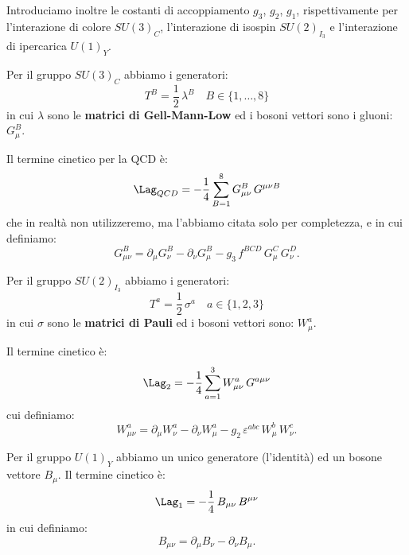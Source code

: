 Introduciamo inoltre le costanti di accoppiamento $g_3$, $g_2$, $g_1$, rispettivamente per l'interazione di colore $SU(3)_C$, l'interazione di isospin $SU(2)_{I_3}$ e l'interazione di ipercarica $U(1)_Y$.

Per il gruppo $SU(3)_C$ abbiamo i generatori:
\begin{equation}
    T^B = \frac{1}{2}\, \lambda^B \quad B\in\{1,\dots,8\}
\end{equation}
in cui $\lambda$ sono le \textbf{matrici di Gell-Mann-Low} ed i bosoni vettori sono i gluoni: $G_\mu^B$.

Il termine cinetico per la QCD è:
\begin{equation}
    \Lag_{QCD} = -\frac{1}{4}\sum_{B=1}^8 G_{\mu\nu}^B\, G^{\mu\nu B}
\end{equation}
che in realtà non utilizzeremo, ma l'abbiamo citata solo per completezza, e in cui definiamo:
\begin{equation}
    G_{\mu\nu}^B = \partial_\mu G_\nu^B - \partial_\nu G_\mu^B - g_3\, f^{BCD}\, G_\mu^C\, G_\nu^D.
\end{equation}

Per il gruppo $SU(2)_{I_3}$ abbiamo i generatori:
\begin{equation}
    T^a = \frac{1}{2}\, \sigma^a \quad a\in\{1,2,3\}
\end{equation}
in cui $\sigma$ sono le \textbf{matrici di Pauli} ed i bosoni vettori sono: $W_\mu^a$.

Il termine cinetico è:
\begin{equation}
    \Lag_{2} = -\frac{1}{4}\sum_{a=1}^3 W_{\mu\nu}^a\, G^{a\mu\nu}
\end{equation}
cui definiamo:
\begin{equation}
    W_{\mu\nu}^a = \partial_\mu W_\nu^a - \partial_\nu W_\mu^a - g_2\, \varepsilon^{abc}\, W_\mu^b\, W_\nu^c.
\end{equation}

Per il gruppo $U(1)_{Y}$ abbiamo un unico generatore (l'identità) ed un bosone vettore $B_\mu$. Il termine cinetico è:
\begin{equation}
    \Lag_1 = -\frac{1}{4}\, B_{\mu\nu}\, B^{\mu\nu}
\end{equation}
in cui definiamo:
\begin{equation}
    B_{\mu\nu} = \partial_\mu B_\nu - \partial_\nu B_\mu.
\end{equation}















